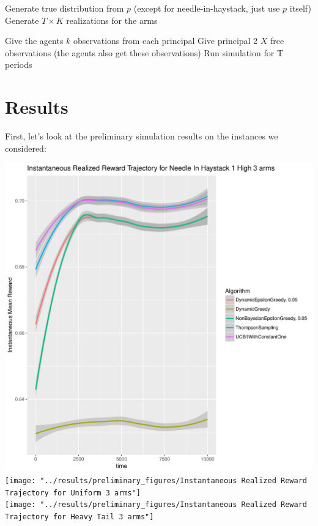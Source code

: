 \documentclass[11pt,letterpaper]{article}
\begin{document}
\begin{algorithm}
\begin{algorithmic}[1]
\State Generate true distribution from $p$ (except for needle-in-haystack, just use $p$ itself)
\State Generate $T \times K$ realizations for the arms 
				
				\State Give the agents $k$ observations from each principal
				\State Give principal 2 $X$ free observations (the agents also get these observations)
				\State Run simulation for T periods
			\EndFor
		\EndFor
	\EndFor
\EndFor
\end{algorithmic}
\end{algorithm}

\section*{Results}

First, let's look at the preliminary simulation results on the instances we considered:

\includegraphics[scale=0.5]{"../results/preliminary_figures/Instantaneous Realized Reward Trajectory for Needle In Haystack 1 High 3 arms"} \\
\texttt{[image: "../results/preliminary\_figures/Instantaneous Realized Reward Trajectory for Uniform 3 arms"]} \\
\texttt{[image: "../results/preliminary\_figures/Instantaneous Realized Reward Trajectory for Heavy Tail 3 arms"]}
\end{document}
